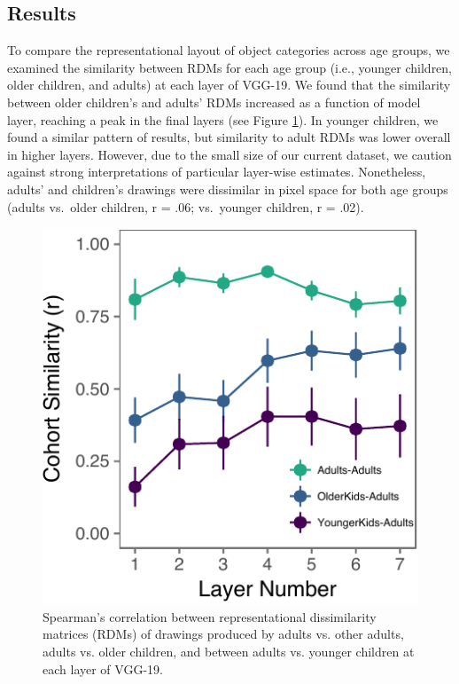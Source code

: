 \documentclass[10pt, letterpaper]{article}
\newenvironment{CodeChunk}{}{}
\begin{document}
\subsection{Results}\label{results-1}

To compare the representational layout of object categories across age
groups, we examined the similarity between RDMs for each age group
(i.e., younger children, older children, and adults) at each layer of
VGG-19. We found that the similarity between older children's and
adults' RDMs increased as a function of model layer, reaching a peak in
the final layers (see Figure \ref{fig:layerWise}). In younger children,
we found a similar pattern of results, but similarity to adult RDMs was
lower overall in higher layers. However, due to the small size of our
current dataset, we caution against strong interpretations of particular
layer-wise estimates. Nonetheless, adults' and children's drawings were
dissimilar in pixel space for both age groups (adults vs.~older
children, r = .06; vs.~younger children, r = .02).

\begin{CodeChunk}
\begin{figure}[H]

{\centering \includegraphics{figs/layerWise-1} 

}

\caption[Spearman's correlation between representational dissimilarity matrices (RDMs) of drawings produced by adults vs]{Spearman's correlation between representational dissimilarity matrices (RDMs) of drawings produced by adults vs. other adults, adults vs. older children, and between adults vs. younger children at each layer of VGG-19. }\label{fig:layerWise}
\end{figure}
\end{CodeChunk}
\end{document}
